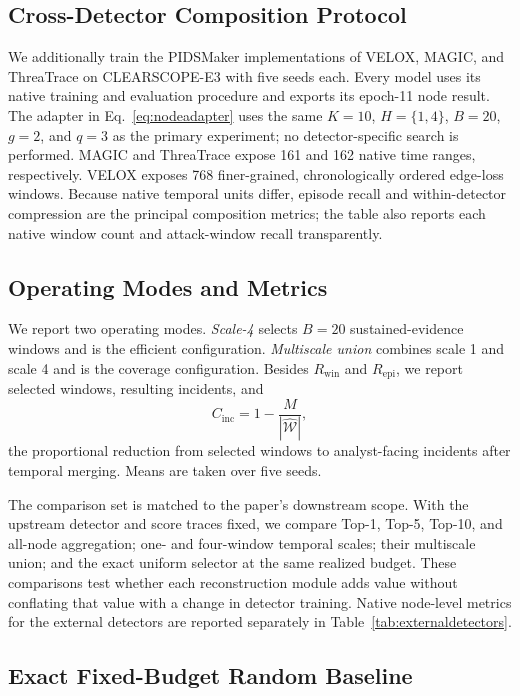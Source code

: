 \documentclass[lettersize,journal]{IEEEtran}
\begin{document}
\subsection{Cross-Detector Composition Protocol}

We additionally train the PIDSMaker implementations of VELOX, MAGIC, and
ThreaTrace on CLEARSCOPE-E3 with five seeds each.  Every model uses its native
training and evaluation procedure and exports its epoch-11 node result.  The
adapter in Eq.~\eqref{eq:nodeadapter} uses the same
$K=10$, $H=\{1,4\}$, $B=20$, $g=2$, and $q=3$ as the primary experiment; no
detector-specific search is performed.  MAGIC and ThreaTrace expose 161 and 162
native time ranges, respectively.  VELOX exposes 768 finer-grained,
chronologically ordered edge-loss windows.  Because native temporal units
differ, episode recall and within-detector compression are the principal
composition metrics; the table also reports each native window count and
attack-window recall transparently.

\subsection{Operating Modes and Metrics}

We report two operating modes.  \emph{Scale-4} selects $B=20$ sustained-evidence
windows and is the efficient configuration.  \emph{Multiscale union} combines
scale 1 and scale 4 and is the coverage configuration.  Besides
$R_{\mathrm{win}}$ and $R_{\mathrm{epi}}$, we report selected windows, resulting
incidents, and
\begin{equation}
 C_{\mathrm{inc}}=1-\frac{M}{|\widehat{\mathcal W}|},
 \label{eq:compression}
\end{equation}
the proportional reduction from selected windows to analyst-facing incidents
after temporal merging.  Means are taken over five seeds.

The comparison set is matched to the paper's downstream scope.  With the
upstream detector and score traces fixed, we compare Top-1, Top-5, Top-10, and
all-node aggregation; one- and four-window temporal scales; their multiscale
union; and the exact uniform selector at the same realized budget.  These
comparisons test whether each reconstruction module adds value without
conflating that value with a change in detector training.  Native node-level
metrics for the external detectors are reported separately in
Table~\ref{tab:externaldetectors}.

\subsection{Exact Fixed-Budget Random Baseline}
\end{document}
